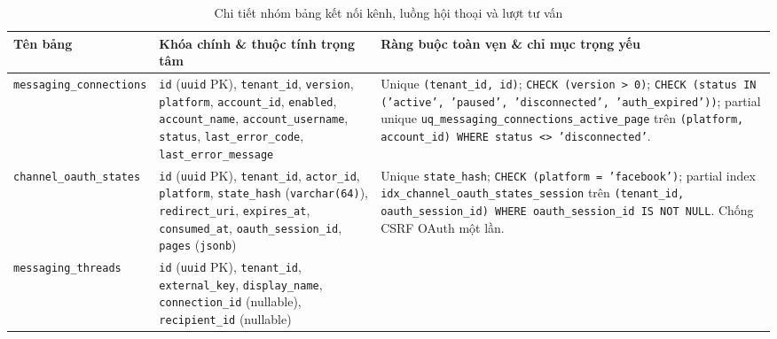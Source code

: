 \begin{table}[htbp]
  \centering
  \footnotesize
  \setlength{\tabcolsep}{4pt}
  \renewcommand{\arraystretch}{1.15}
  \caption{Chi tiết nhóm bảng kết nối kênh, luồng hội thoại và lượt tư vấn}\label{tab:app-messaging}
  \begin{tabularx}{\linewidth}{@{}
    >{\raggedright\arraybackslash}p{3.4cm}
    >{\raggedright\arraybackslash}p{5.0cm}
    >{\raggedright\arraybackslash}X@{}}
    \toprule
    Tên bảng & Khóa chính \& thuộc tính trọng tâm & Ràng buộc toàn vẹn \& chỉ mục trọng yếu \\
    \midrule
    \texttt{messaging\_\hspace{0pt}connections} &
    \texttt{id} (\texttt{uuid} PK), \texttt{tenant\_id}, \texttt{version}, \texttt{platform}, \texttt{account\_id}, \texttt{enabled}, \texttt{account\_name}, \texttt{account\_username}, \texttt{status}, \texttt{last\_error\_code}, \texttt{last\_error\_message} &
    Unique \texttt{(tenant\_id, id)}; \texttt{CHECK (version > 0)}; \texttt{CHECK (status IN ('active', 'paused', 'disconnected', 'auth\_expired'))}; partial unique \texttt{uq\_\hspace{0pt}messaging\_\hspace{0pt}connections\_\hspace{0pt}active\_\hspace{0pt}page} trên \texttt{(platform, account\_id) WHERE status <> 'disconnected'}. \\
    \texttt{channel\_\hspace{0pt}oauth\_states} &
    \texttt{id} (\texttt{uuid} PK), \texttt{tenant\_id}, \texttt{actor\_id}, \texttt{platform}, \texttt{state\_hash} (\texttt{varchar(64)}), \texttt{redirect\_uri}, \texttt{expires\_at}, \texttt{consumed\_at}, \texttt{oauth\_session\_id}, \texttt{pages} (\texttt{jsonb}) &
    Unique \texttt{state\_hash}; \texttt{CHECK (platform = 'facebook')}; partial index \texttt{idx\_\hspace{0pt}channel\_\hspace{0pt}oauth\_\hspace{0pt}states\_\hspace{0pt}session} trên \texttt{(tenant\_id, oauth\_session\_id) WHERE oauth\_session\_id IS NOT NULL}. Chống CSRF OAuth một lần. \\
    \texttt{messaging\_\hspace{0pt}threads} &
    \texttt{id} (\texttt{uuid} PK), \texttt{tenant\_id}, \texttt{external\_key}, \texttt{display\_name}, \texttt{connection\_id} (nullable), \texttt{recipient\_id} (nullable) &

\end{tabularx}
\end{table}
